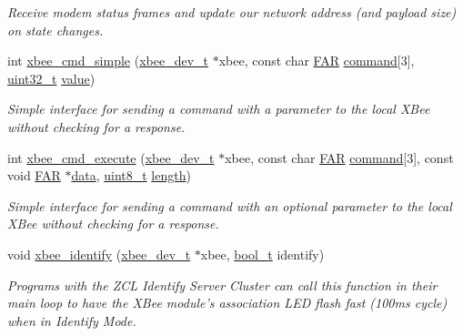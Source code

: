 \begin{DoxyCompactItemize}
\begin{DoxyCompactList}\small\item\em Receive modem status frames and update our network address (and payload size) on state changes. \end{DoxyCompactList}\item 
int \hyperlink{group__xbee__atcmd_ga6b157fe048c0082253056a7bda0ba9bb}{xbee\-\_\-cmd\-\_\-simple} (\hyperlink{structxbee__dev__t}{xbee\-\_\-dev\-\_\-t} $\ast$xbee, const char \hyperlink{group__hal_gaef060b3456fdcc093a7210a762d5f2ed}{F\-A\-R} \hyperlink{group__xbee__atcmd_ga1a5aaa930940857f68f245eeb89506b5}{command}\mbox{[}3\mbox{]}, \hyperlink{group__hal__dos_ga09a1e304d66d35dd47daffee9731edaa}{uint32\-\_\-t} \hyperlink{group__zcl_ga1ed5b151a90f7e99af8cca2e6875ddf4}{value})
\begin{DoxyCompactList}\small\item\em Simple interface for sending a command with a parameter to the local X\-Bee without checking for a response. \end{DoxyCompactList}\item 
int \hyperlink{group__xbee__atcmd_ga19d16fbaf1da1cc581fbedcb36f7263f}{xbee\-\_\-cmd\-\_\-execute} (\hyperlink{structxbee__dev__t}{xbee\-\_\-dev\-\_\-t} $\ast$xbee, const char \hyperlink{group__hal_gaef060b3456fdcc093a7210a762d5f2ed}{F\-A\-R} \hyperlink{group__xbee__atcmd_ga1a5aaa930940857f68f245eeb89506b5}{command}\mbox{[}3\mbox{]}, const void \hyperlink{group__hal_gaef060b3456fdcc093a7210a762d5f2ed}{F\-A\-R} $\ast$\hyperlink{group__xbee__io_gac5955aa1e44ff234e6d78a19cf68f25c}{data}, \hyperlink{group__hal_gae1affc9ca37cfb624959c866a73f83c2}{uint8\-\_\-t} \hyperlink{group__zdo_gab2b3adeb2a67e656ff030b56727fd0ac}{length})
\begin{DoxyCompactList}\small\item\em Simple interface for sending a command with an optional parameter to the local X\-Bee without checking for a response. \end{DoxyCompactList}\item 
void \hyperlink{group__xbee__atcmd_ga42768d8f8aa841ed4f42396cff2815aa}{xbee\-\_\-identify} (\hyperlink{structxbee__dev__t}{xbee\-\_\-dev\-\_\-t} $\ast$xbee, \hyperlink{group__hal_ga04dd5074964518403bf944f2b240a5f8}{bool\-\_\-t} identify)
\begin{DoxyCompactList}\small\item\em Programs with the Z\-C\-L Identify Server Cluster can call this function in their main loop to have the X\-Bee module's association L\-E\-D flash fast (100ms cycle) when in Identify Mode. \end{DoxyCompactList}\end{DoxyCompactItemize}
